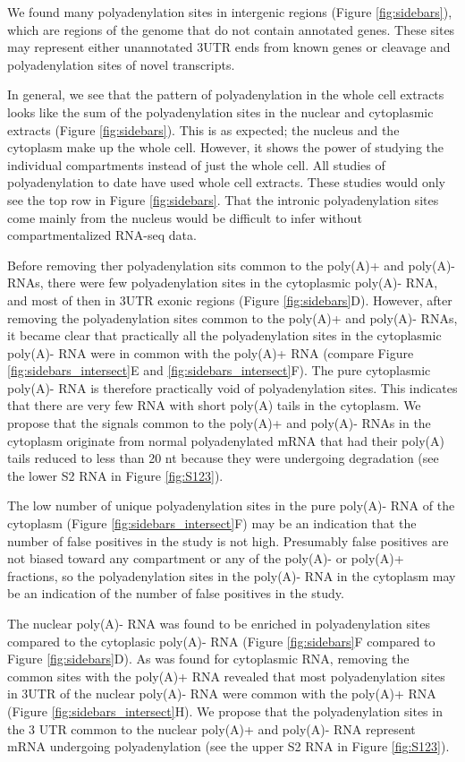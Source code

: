 We found many polyadenylation sites in intergenic regions (Figure
\ref{fig:sidebars}), which are regions of the genome that do not contain
annotated genes. These sites may represent either unannotated 3\ppp UTR
ends from known genes or cleavage and polyadenylation sites of novel
transcripts.

In general, we see that the pattern of polyadenylation in the whole cell
extracts looks like the sum of the polyadenylation sites in the nuclear and
cytoplasmic extracts (Figure \ref{fig:sidebars}). This is as expected; the
nucleus and the cytoplasm make up the whole cell. However, it shows the power
of studying the individual compartments instead of just the whole cell. All
studies of polyadenylation to date have used whole cell extracts. These studies
would only see the top row in Figure \ref{fig:sidebars}. That the intronic
polyadenylation sites come mainly from the nucleus would be difficult to infer
without compartmentalized RNA-seq data.

Before removing ther polyadenylation sits common to the poly(A)+ and poly(A)-
RNAs, there were few polyadenylation sites in the cytoplasmic poly(A)- RNA,
and most of then in 3\ppp UTR exonic regions (Figure \ref{fig:sidebars}D).
However, after removing the polyadenylation sites common to the poly(A)+ and
poly(A)- RNAs, it became clear that practically all the polyadenylation sites in
the cytoplasmic poly(A)- RNA were in common with the poly(A)+ RNA
(compare Figure \ref{fig:sidebars_intersect}E and
\ref{fig:sidebars_intersect}F). The pure cytoplasmic poly(A)- RNA is
therefore practically void of polyadenylation sites. This indicates that there
are very few RNA with short poly(A) tails in the cytoplasm. We propose that the
signals common to the poly(A)+ and poly(A)- RNAs in the cytoplasm
originate from normal polyadenylated mRNA that had their poly(A) tails reduced
to less than 20 nt because they were undergoing degradation (see the lower S2
RNA in Figure \ref{fig:S123}).

The low number of unique polyadenylation sites in the pure poly(A)- RNA of the
cytoplasm (Figure \ref{fig:sidebars_intersect}F) may be an indication that the
number of false positives in the study is not high. Presumably false positives
are not biased toward any compartment or any of the poly(A)- or poly(A)+
fractions, so the polyadenylation sites in the poly(A)- RNA in the cytoplasm
may be an indication of the number of false positives in the study. 

The nuclear poly(A)- RNA was found to be enriched in polyadenylation sites
compared to the cytoplasic poly(A)- RNA (Figure \ref{fig:sidebars}F compared to
Figure \ref{fig:sidebars}D). As was found for cytoplasmic RNA, removing the
common sites with the poly(A)+ RNA revealed that most polyadenylation sites in
3\ppp UTR of the nuclear poly(A)- RNA were common with the poly(A)+ RNA (Figure
\ref{fig:sidebars_intersect}H). We propose that the polyadenylation sites in the 3\ppp
UTR common to the nuclear poly(A)+ and poly(A)- RNA represent mRNA undergoing
polyadenylation (see the upper S2 RNA in Figure \ref{fig:S123}).

